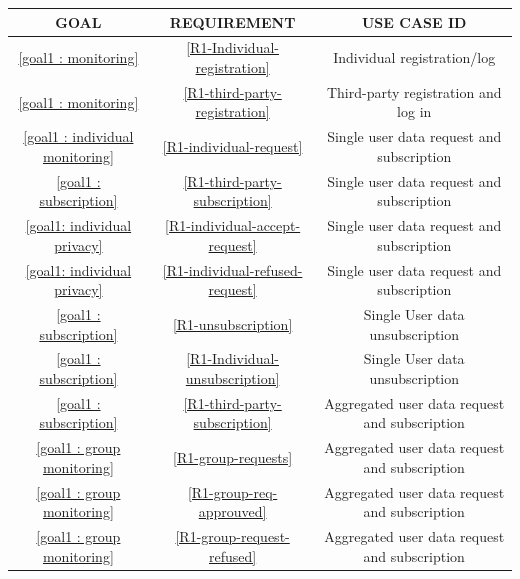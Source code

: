          \begin{table}[H]
            	\centering
                \begin{tabular}{|c|c|c|}
                    \hline
                    \rowcolor[HTML]{FDD835} \textbf{ GOAL} & \textbf{ REQUIREMENT} & \textbf{USE CASE ID}\\
                    \hline
                    \ref{goal1 : monitoring} & \ref{R1-Individual-registration} & Individual registration/log \\
                    \hline
                     \ref{goal1 : monitoring} & \ref{R1-third-party-registration} & Third-party registration and log in\\
                    \hline
                    \ref{goal1 : individual monitoring} & \ref{R1-individual-request} & Single user data request and subscription\\
                    \hline
                    \ref{goal1 : subscription} & \ref{R1-third-party-subscription} & Single user data request and subscription\\
                    \hline
                    \ref{goal1: individual privacy} & \ref{R1-individual-accept-request} & Single user data request and subscription\\
                    \hline
                    \ref{goal1: individual privacy} & \ref{R1-individual-refused-request} & Single user data request and subscription\\
                    \hline
                    \ref{goal1 : subscription}  & \ref{R1-unsubscription} & Single User data unsubscription\\
                    \hline
                    \ref{goal1 : subscription} & \ref{R1-Individual-unsubscription} & Single User data unsubscription\\
                    \hline
                    \ref{goal1 : subscription} & \ref{R1-third-party-subscription}& Aggregated user data request and subscription\\
                    \hline
                    \ref{goal1 : group monitoring} & \ref{R1-group-requests}& Aggregated user data request and subscription\\
                    \hline
                    \ref{goal1 : group monitoring} & \ref{R1-group-req-approuved}& Aggregated user data request and subscription\\
                    \ref{goal1 : group monitoring} & \ref{R1-group-request-refused}& Aggregated user data request and subscription\\

\end{tabular}
\end{table}
